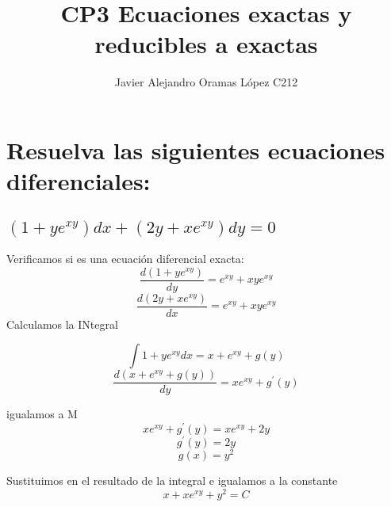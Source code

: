 \documentclass{article}
\title{CP3 Ecuaciones exactas y reducibles a exactas}
\author{Javier Alejandro Oramas López C212}
\begin{document}
    
    \section{Resuelva las siguientes ecuaciones diferenciales:}
        \subsection{$(1 + ye^{xy})dx + (2y + xe^{xy})dy = 0$}
            Verificamos si es una ecuación diferencial exacta:
            \[ \frac{d(1+ye^{xy})}{dy} = e^{xy} + xye^{xy}\]
            \[ \frac{d(2y+xe^{xy})}{dx} = e^{xy} + xye^{xy}\]
            Calculamos la INtegral

            \[\int 1+ye^{xy} dx = x+e^{xy} + g(y) \]
            \[\frac{d(x+e^{xy}+g(y))}{dy} = xe^{xy}+g^{'}(y)\]

            igualamos a M
            \[xe^{xy}+g^{'}(y) = xe^{xy} +2y\]
            \[g^{'}(y) = 2y\]
            \[g(x) = y^2\]

            Sustituimos en el resultado de la integral e igualamos a la constante
            \[x+xe^{xy}+y^2 = C\]
\end{document}
